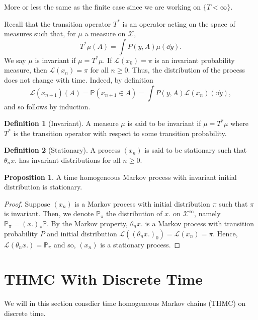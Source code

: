 \documentclass[]{article}
\theoremstyle{definition}
\theoremstyle{definition}
\newtheorem{definition}{Definition}[section]
\newtheorem{proposition}{Proposition}[section]
\begin{document}
More or less the same as the finite case since we are working on \(\{T < \infty\}\).

Recall that the transition operator \(T^*\) is an operator acting on the space of 
measures such that, for \(\mu\) a measure on \(\mathcal{X}\), 
\[T^* \mu(A) = \int P(y, A) \mu(\dd y).\]
We say \(\mu\) is invariant if \(\mu = T^* \mu\). If \(\mathcal{L}(x_0) = \pi\) 
is an invariant probability measure, then \(\mathcal{L}(x_n) = \pi\) for all \(n \ge 0\).
Thus, the distribution of the process does not change with time. Indeed, 
by definition 
\[\mathcal{L}(x_{n + 1})(A) = \mathbb{P}(x_{n + 1} \in A) = \int P(y, A) \mathcal{L}(x_n)(\dd y),\]
and so follows by induction.

\begin{definition}[Invariant]
  A measure \(\mu\) is said to be invariant if \(\mu = T^* \mu\) where \(T^*\) is 
  the transition operator with respect to some transition probability.
\end{definition}

\begin{definition}[Stationary]
  A process \((x_n)\) is said to be stationary such that \(\theta_n x.\) has invariant 
  distributions for all \(n \ge 0\).
\end{definition}

\begin{proposition}
  A time homogeneous Markov process with invariant initial distribution is stationary.
\end{proposition}
\begin{proof}
  Suppose \((x_n)\) is a Markov process with initial distribution \(\pi\) such that 
  \(\pi\) is invariant. Then, we denote \(\mathbb{P}_\pi\) the distribution of \(x.\) 
  on \(\mathcal{X}^\infty\), namely \(\mathbb{P}_\pi = (x.)_*\mathbb{P}\). By the 
  Markov property, \(\theta_n x.\) is a Markov process with transition probability \(P\) 
  and initial distribution \(\mathcal{L}((\theta_n x.)_0) = \mathcal{L}(x_n) = \pi\). 
  Hence, \(\mathcal{L}(\theta_n x.) = \mathbb{P}_\pi\) and so, \((x_n)\) is a stationary 
  process.
\end{proof}

\newpage
\section{THMC With Discrete Time}

We will in this section consdier time homogeneous Markov chains (THMC) on discrete time.
\end{document}

